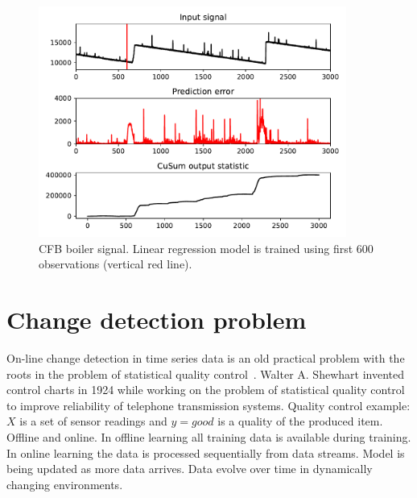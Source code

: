 \documentclass[doctoral,utf8,lot,loar,lof,shortloft,index]{jydiss}
\begin{document}
\begin{figure}[!htb]
	\centering
	\includegraphics[width=0.9\textwidth]{images/boiler_fixed_train}
	\caption{CFB boiler signal.
Linear regression model is trained using first 600 observations (vertical red line).	
}\label{fig:boiler_fixed_train}
\end{figure}

\section{Change detection problem}

On-line change detection in time series data is an old practical problem with the roots in the problem of statistical quality control~\cite{basseville1993detection,NISTbook}.
Walter A. Shewhart invented control charts in 1924 while working on the problem of statistical quality control to improve reliability of telephone transmission systems. 
Quality control example: $X$ is a set of sensor readings and $y=good$ is a quality of the produced item. 
Offline and online. 
In offline learning all training data is available during training. 
In online learning the data is processed sequentially from data streams.
Model is being updated as more data arrives. 
Data evolve over time in dynamically changing environments.
\end{document}
